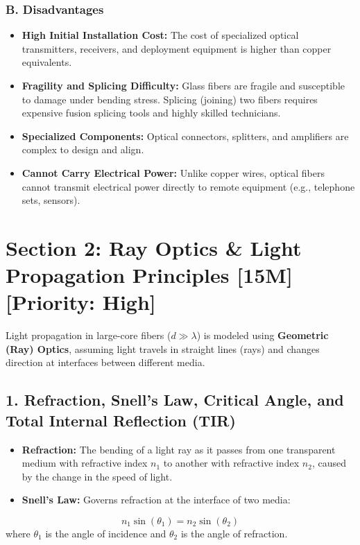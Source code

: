 \subsubsection{B. Disadvantages}
\begin{itemize}
  \item   \textbf{High Initial Installation Cost:} The cost of specialized optical transmitters, receivers, and deployment equipment is higher than copper equivalents.
  \item   \textbf{Fragility and Splicing Difficulty:} Glass fibers are fragile and susceptible to damage under bending stress. Splicing (joining) two fibers requires expensive fusion splicing tools and highly skilled technicians.
  \item   \textbf{Specialized Components:} Optical connectors, splitters, and amplifiers are complex to design and align.
  \item   \textbf{Cannot Carry Electrical Power:} Unlike copper wires, optical fibers cannot transmit electrical power directly to remote equipment (e.g., telephone sets, sensors).
\end{itemize}


\section{Section 2: Ray Optics \& Light Propagation Principles [15M] [Priority: High]}

Light propagation in large-core fibers ($d \gg \lambda$) is modeled using \textbf{Geometric (Ray) Optics}, assuming light travels in straight lines (rays) and changes direction at interfaces between different media.

\subsection{1. Refraction, Snell's Law, Critical Angle, and Total Internal Reflection (TIR)}

\begin{itemize}
  \item   \textbf{Refraction:} The bending of a light ray as it passes from one transparent medium with refractive index $n_1$ to another with refractive index $n_2$, caused by the change in the speed of light.
  \item   \textbf{Snell's Law:} Governs refraction at the interface of two media:
\end{itemize}
    \[ n_1 \sin(\theta_1) = n_2 \sin(\theta_2) \]
    where $\theta_1$ is the angle of incidence and $\theta_2$ is the angle of refraction.

